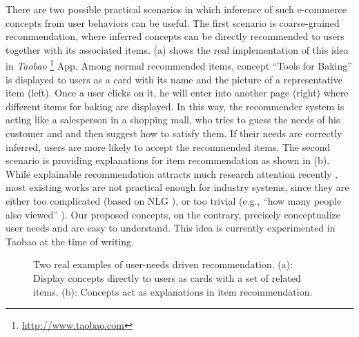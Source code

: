 There are two possible practical scenarios in which 
inference of such e-commerce concepts from user behaviors can be useful. 
The first scenario is coarse-grained recommendation,
where inferred concepts can be directly recommended to users 
together with its associated items.
(a) shows the real implementation of this idea in 
\textit{Taobao} \footnote{\url{http://www.taobao.com}} App.
Among normal recommended items, 
concept ``Tools for Baking'' is displayed to users as a card with its name and the picture of a representative item (left).
Once a user clicks on it, he will enter into another page (right) where different items for baking are displayed.
In this way, the recommender system is acting like a salesperson in a shopping mall, 
who tries to guess the needs of his customer and and then suggest how to satisfy
them. If their needs are correctly inferred, users are more likely to accept 
the recommended items.
The second scenario is providing explanations for item recommendation as 
shown in (b).
While explainable recommendation attracts much research attention 
recently \cite{zhang2018explainable}, 
most existing works are not practical enough for industry systems,
since they are either too complicated 
(based on NLG \cite{zanker2010knowledgeable,cleger2012explaining}), or too trivial 
(e.g., ``how many people also viewed'' \cite{costa2018automatic,li2017neural}).
Our proposed concepts, on the contrary, precisely conceptualize user needs and are
easy to understand. This idea is currently experimented in Taobao at the time of 
writing. 

\begin{figure}[th]
	\centering
	\caption{Two real examples of user-needs driven recommendation.
		(a): Display concepts directly to users as cards with a set of related items. (b): Concepts act as explanations in item recommendation.
	}
	\label{fig:cloud}
\end{figure}

